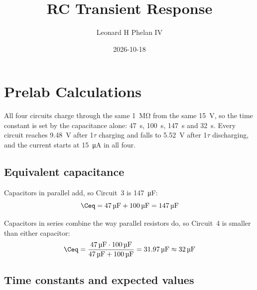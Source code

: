 \documentclass[offwhitecover]{lennylab}
\title{RC Transient Response}
\author{Leonard H Phelan IV}
\date{2026-10-18}
\newcommand{\ntau}[1]{#1\(\tau\)}   %
\newcommand{\partlabel}[1]{\headlabel{Part~#1}}
\begin{document}
\maketitle
\tableofcontents

\section{\partlabel{1}Prelab Calculations}

All four circuits charge through the same \qty{1}{\mega\ohm} from the same \qty{15}{\volt}, so the time constant is set by the capacitance alone: \qty{47}{\second}, \qty{100}{\second}, \qty{147}{\second} and \qty{32}{\second}. Every circuit reaches \qty{9.48}{\volt} after \ntau{1} charging and falls to \qty{5.52}{\volt} after \ntau{1} discharging, and the current starts at \qty{15}{\micro\ampere} in all four.

\begin{marginfigure}
  
  \caption{The four RC circuits from the Part~1 table, redrawn from the handout, with the AV probes from the Part~2 Multisim build. Each probe reads its node's voltage to ground and the current in the direction of its arrow, into the capacitor, and is named for its circuit's time constant.}
  \label{fig:circuits}
\end{marginfigure}

\subsection{Equivalent capacitance}

Capacitors in parallel add, so Circuit~3 is \qty{147}{\micro\farad}:
\begin{equation}
  \Ceq = \qty{47}{\micro\farad} + \qty{100}{\micro\farad} = \qty{147}{\micro\farad}
\end{equation}

Capacitors in series combine the way parallel resistors do, so Circuit~4 is smaller than either capacitor:
\begin{equation}
  \Ceq = \frac{\qty{47}{\micro\farad} \cdot \qty{100}{\micro\farad}}
              {\qty{47}{\micro\farad} + \qty{100}{\micro\farad}}
       = \qty{31.97}{\micro\farad} \approx \qty{32}{\micro\farad}
\end{equation}

\subsection{Time constants and expected values}
\end{document}
